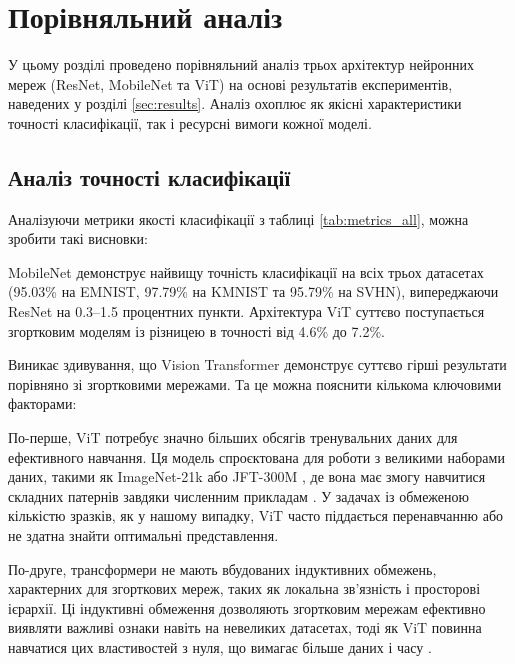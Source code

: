 \documentclass[14pt,a4paper]{extarticle}
\begin{document}
\section{Порівняльний аналіз}
\label{sec:analysis}

У цьому розділі проведено порівняльний аналіз трьох архітектур нейронних мереж (ResNet, MobileNet та ViT) на основі результатів експериментів, наведених у розділі \ref{sec:results}. Аналіз охоплює як якісні характеристики точності класифікації, так і ресурсні вимоги кожної моделі.

\subsection{Аналіз точності класифікації}

Аналізуючи метрики якості класифікації з таблиці \ref{tab:metrics_all}, можна зробити такі висновки:

MobileNet демонструє найвищу точність класифікації на всіх трьох датасетах (95.03\% на EMNIST, 97.79\% на KMNIST та 95.79\% на SVHN), випереджаючи ResNet на 0.3–1.5 процентних пункти. Архітектура ViT суттєво поступається згортковим моделям із різницею в точності від 4.6\% до 7.2\%.

Виникає здивування, що Vision Transformer демонструє суттєво гірші результати порівняно зі згортковими мережами. Та це можна пояснити кількома ключовими факторами:

По-перше, ViT потребує значно більших обсягів тренувальних даних для ефективного навчання. Ця модель спроєктована для роботи з великими наборами даних, такими як ImageNet-21k \cite{imagenet21k} або JFT-300M \cite{googlejft300m, mahajan2018exploring}, де вона має змогу навчитися складних патернів завдяки численним прикладам \cite{dosovitskiy2020vit}. У задачах із обмеженою кількістю зразків, як у нашому випадку, ViT часто піддається перенавчанню або не здатна знайти оптимальні представлення.

По-друге, трансформери не мають вбудованих індуктивних обмежень, характерних для згорткових мереж, таких як локальна зв’язність і просторові ієрархії. Ці індуктивні обмеження дозволяють згортковим мережам ефективно виявляти важливі ознаки навіть на невеликих датасетах, тоді як ViT повинна навчатися цих властивостей з нуля, що вимагає більше даних і часу \cite{convit2021, bridginggap2022}.

\end{document}
